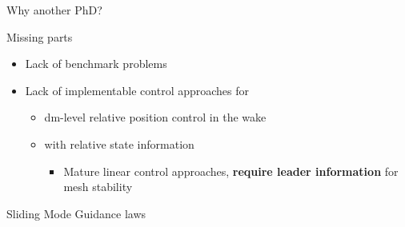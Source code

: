 \documentclass[12pt,svgnames,table,draft=false]{beamer}
\begin{document}
\usebackgroundtemplate{}

\begin{frame}
\centering
\Large
\vspace{3em}
Why another PhD?
\end{frame}


\begin{frame}{Missing parts}
\centering
\vspace{-6em}
\begin{tcolorbox}[width=.99\textwidth,
colback={gray!10!},
standard jigsaw,
opacityback=1,  %
]  
\begin{itemize}
\item Lack of benchmark problems
\item Lack of implementable control approaches for 
\begin{itemize}
\item dm-level relative position control in the wake 
\item with relative state information
\begin{itemize}
\item Mature linear control approaches, \textbf{require leader information} for mesh stability
\end{itemize}
\end{itemize}
\end{itemize}
\end{tcolorbox}
\end{frame}

\usebackgroundtemplate{}
\begin{frame}
\centering
\Large
\vspace{3em}
Sliding Mode Guidance laws
\end{frame}
\end{document}
